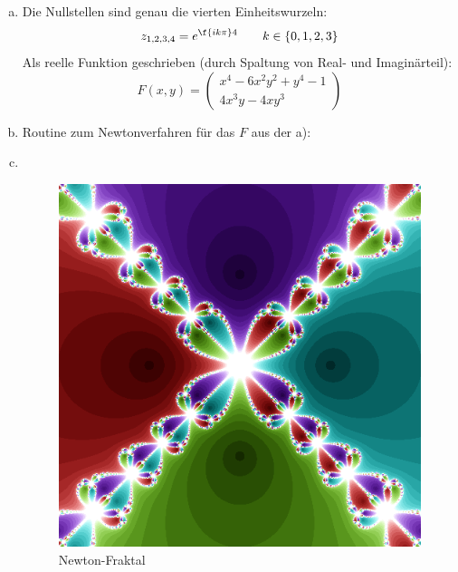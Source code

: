 \documentclass[a4paper]{scrartcl}
\begin{document}
\begin{aufgabe}
	
	\begin{enumerate}[a)]
		\item
			Die Nullstellen sind genau die vierten Einheitswurzeln:
			\[
				z_{1,2,3,4} = e^{\f {ik\pi}4} \qquad k \in \{0,1,2,3\}
			\]
			Als reelle Funktion geschrieben (durch Spaltung von Real- und Imaginärteil):
			\[
				F(x,y) = \begin{pmatrix}
					x^4 - 6x^2y^2 + y^4 - 1 \\
					4x^3y - 4xy^3
				\end{pmatrix}
			\]
		\item
			Routine zum Newtonverfahren für das $F$ aus der a):
			
			\newpage
		\item ~
			
			\newpage
			\begin{figure}[h]
				\centering
				\caption{Newton-Fraktal}
				\includegraphics[scale=0.6]{num1_13_4/fraktal.png}
			\end{figure}
	\end{enumerate}
\end{aufgabe}
\end{document}
